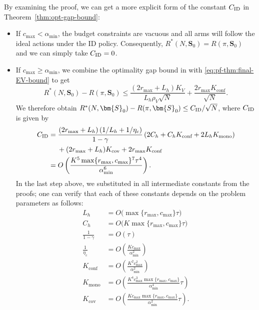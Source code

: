 \documentclass{article}
\theoremstyle{plain}
\theoremstyle{remark}
\newcommand{\rmax}{r_{\max}}
\newcommand{\cmax}{c_{\max}}
\newcommand{\rhov}{\rho_V}
\newcommand{\Kv}{K_V}
\newcommand{\ID}{\textnormal{ID}}
\newcommand{\conf}{\text{conf}}
\newcommand{\mono}{\text{mono}}
\newcommand{\cov}{\text{cov}}
\newcommand{\bracket}[1]{\left(#1\right)}
\begin{document}
    By examining the proof, we can get a more explicit form of the constant $C_{\ID}$ in Theorem~\ref{thm:opt-gap-bound}: 
    \begin{itemize}%
        \item If $\cmax < \alpha_{\min}$, the budget constraints are vacuous and all arms will follow the ideal actions under the ID policy. Consequently, $R^*(N,\bm{S}_0) = R(\pi,\bm{S}_0)$ and we can simply take $C_{\ID} = 0$. 
        \item If $\cmax \geq \alpha_{\min}$, we combine the optimality gap bound in  with \eqref{eq:pf-thm:final-EV-bound} to get
        \begin{equation*}
            R^*(N,\bm{S}_0)-R(\pi,\bm{S}_0)\leq \frac{(2r_{\max}+L_h)\Kv}{L_h \rhov \sqrt{N}} + \frac{2r_{\max} K_{\conf}}{\sqrt{N}}. 
        \end{equation*}
        We therefore obtain $R^*(N,\bm{S}_0)-R(\pi,\bm{S}_0) \leq C_{\ID} / \sqrt{N}$, where $C_{\ID}$ is given by
        \begin{align*}
             C_{\ID}&=\frac{\bracket{2\rmax + L_h}\bracket{1/L_h + 1/\eta_c}}{1-\gamma} \bracket{2C_h+ C_h K_{\conf}+2L_hK_{\mono}} \\
             &\mspace{23mu} + (2\rmax+L_h)K_{\cov} + 2 r_{\max} K_{\conf} \\
             &= O\left(\frac{K^5 \max\{r_{\max}, c_{\max}\}^7 \tau^4}{\alpha_{\min}^6}\right). 
        \end{align*} 
        In the last step above, we substituted in all intermediate constants from the proofs; one can verify that each of these constants depends on the problem parameters as follows: 
        \begin{align*}
            L_h &= O\big(\max\{\rmax, \cmax\}\tau\big) \\
            C_h &= O\big(K \max\{\rmax, \cmax\}\tau\big) \\
            \frac{1}{1-\gamma} &= O(\tau) \\
            \frac{1}{\eta_c} &= O\left(\frac{K \cmax}{\alpha_{\min}^2}\right) \\
            K_{\conf} &= O\left(\frac{K^2 \cmax^2}{\alpha_{\min}^2}\right) \\
            K_{\mono} &= O\left(\frac{K^4 \cmax^3 \max\{\rmax, \cmax\}}{\alpha_{\min}^4}\tau \right) \\
            K_{\cov} &= O\left(\frac{K \cmax \max\{\rmax, \cmax\}}{\alpha_{\min}^2} \tau\right). 
        \end{align*}
    \end{itemize}
\end{document}
